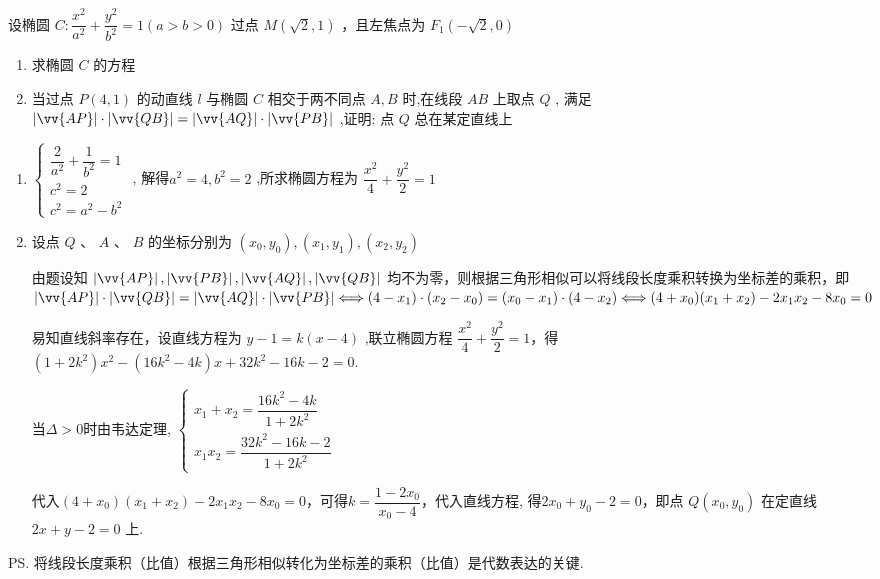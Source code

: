 设椭圆 $C : \dfrac{{x}^{2}}{{a}^{2}} + \dfrac{{y}^{2}}{{b}^{2}} = 1\left( {a > b > 0}\right)$ 过点 $M\left( {\sqrt{2},1}\right)$ ，且左焦点为 ${F}_{1}\left( {-\sqrt{2},0}\right)$
\begin{enumerate}[(1)]
    \item 求椭圆 $C$ 的方程
    \item 当过点 $P\left( {4,1}\right)$ 的动直线 $l$ 与椭圆 $C$ 相交于两不同点 $A,B$ 时,在线段 ${AB}$ 上取点 $Q$ , 满足 $\left| \vv{AP}\right|  \cdot  \left| \vv{QB}\right|  = \left| \vv{AQ}\right|  \cdot  \left| \vv{PB}\right|$ ,证明: 点 $Q$ 总在某定直线上
\end{enumerate}
\begin{jieda}
    \begin{enumerate}[(1)]
        \item $\left\{\begin{array}{l}
             \dfrac{2}{{a}^{2}} + \dfrac{1}{{b}^{2}} = 1  \\
             {c}^{2} = 2 \\
             {c}^{2} = {a}^{2} - {b}^{2}
        \end{array}\right.$  , 解得${a}^{2} = 4,{b}^{2} = 2$ ,所求椭圆方程为 $\dfrac{{x}^{2}}{4} + \dfrac{{y}^{2}}{2} = 1$

        \item 设点 ${Q}\text{ 、 }{A}\text{ 、 }{B}$ 的坐标分别为 $\left( x_0, y_0\right) ,\left( {{x}_{1},{y}_{1}}\right) ,\left( {{x}_{2},{y}_{2}}\right)$

        由题设知 $\left| \vv{AP}\right| ,\left| \vv{PB}\right| ,\left| \vv{AQ}\right| ,\left| \vv{QB}\right|$ 均不为零，则根据三角形相似可以将线段长度乘积转换为坐标差的乘积，即$\left| \vv{AP}\right|  \cdot  \left| \vv{QB}\right|  = \left| \vv{AQ}\right|  \cdot  \left| \vv{PB}\right| \Longleftrightarrow  (4-x_1) \cdot (x_2-x_0) = (x_0-x_1) \cdot (4-x_2) \Longleftrightarrow (4+x_0)(x_1+x_2) - 2x_1x_2-8x_0 = 0$

        易知直线斜率存在，设直线方程为 $y - 1 = k\left( {x - 4}\right)$ ,联立椭圆方程 $\dfrac{{x}^{2}}{4} + \dfrac{{y}^{2}}{2} = 1$，得 $\left( {1 + 2{k}^{2}}\right) {x}^{2} - \left( {{16}{k}^{2} - {4k}}\right) x + {32}{k}^{2} - {16k} - 2 = 0.$

        当$\Delta > 0$时由韦达定理, $\left\{\begin{array}{l}
             {x}_{1} + {x}_{2} = \dfrac{{16}{k}^{2} - {4k}}{1 + 2{k}^{2}}  \\
             {x}_{1}{x}_{2} = \dfrac{{32}{k}^{2} - {16k} - 2}{1 + 2{k}^{2}}
        \end{array}\right.$
        
        代入$(4+x_0)(x_1+x_2) - 2x_1x_2-8x_0 = 0$，可得$k = \dfrac{1-2x_0}{x_0-4}$，代入直线方程, 得$2{x}_{0} + {y}_{0} - 2 = 0$，即点 $Q\left( {{x}_{0},{y}_{0}}\right)$ 在定直线 ${2x} + y - 2 = 0$ 上.
    \end{enumerate}
    \ps 将线段长度乘积（比值）根据三角形相似转化为坐标差的乘积（比值）是代数表达的关键.
\end{jieda}

